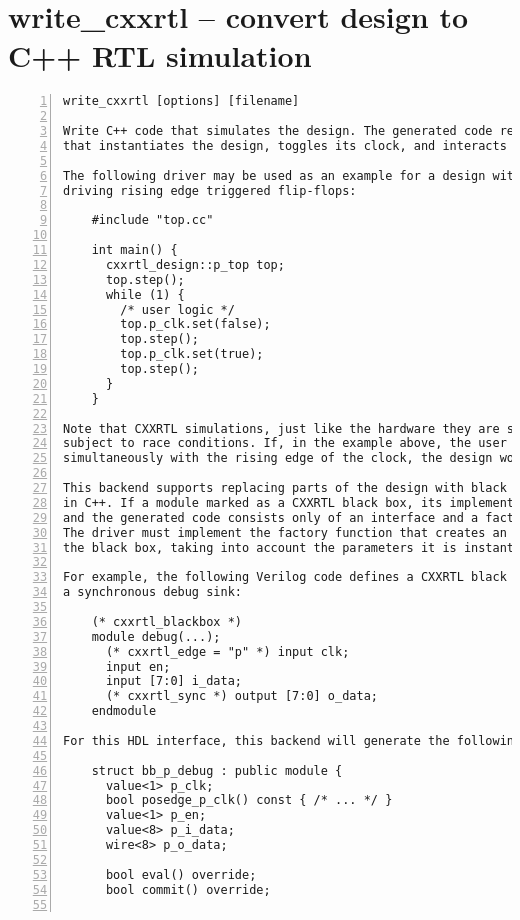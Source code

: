 \section{write\_cxxrtl -- convert design to C++ RTL simulation}
\label{cmd:write_cxxrtl}
\begin{lstlisting}[numbers=left,frame=single]
    write_cxxrtl [options] [filename]

Write C++ code that simulates the design. The generated code requires a driver
that instantiates the design, toggles its clock, and interacts with its ports.

The following driver may be used as an example for a design with a single clock
driving rising edge triggered flip-flops:

    #include "top.cc"

    int main() {
      cxxrtl_design::p_top top;
      top.step();
      while (1) {
        /* user logic */
        top.p_clk.set(false);
        top.step();
        top.p_clk.set(true);
        top.step();
      }
    }

Note that CXXRTL simulations, just like the hardware they are simulating, are
subject to race conditions. If, in the example above, the user logic would run
simultaneously with the rising edge of the clock, the design would malfunction.

This backend supports replacing parts of the design with black boxes implemented
in C++. If a module marked as a CXXRTL black box, its implementation is ignored,
and the generated code consists only of an interface and a factory function.
The driver must implement the factory function that creates an implementation of
the black box, taking into account the parameters it is instantiated with.

For example, the following Verilog code defines a CXXRTL black box interface for
a synchronous debug sink:

    (* cxxrtl_blackbox *)
    module debug(...);
      (* cxxrtl_edge = "p" *) input clk;
      input en;
      input [7:0] i_data;
      (* cxxrtl_sync *) output [7:0] o_data;
    endmodule

For this HDL interface, this backend will generate the following C++ interface:

    struct bb_p_debug : public module {
      value<1> p_clk;
      bool posedge_p_clk() const { /* ... */ }
      value<1> p_en;
      value<8> p_i_data;
      wire<8> p_o_data;

      bool eval() override;
      bool commit() override;


\end{lstlisting}
